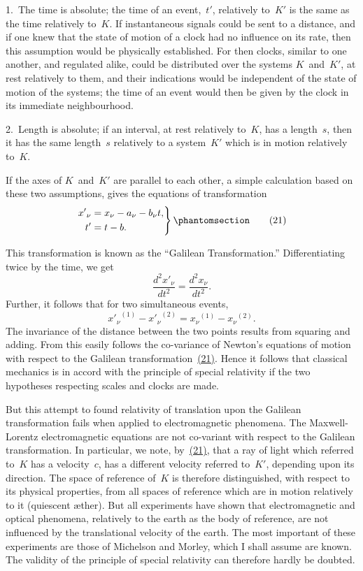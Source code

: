 \documentclass[12pt]{book}[2005/09/16]
\newcommand{\TNote}[1]{}
\newcommand{\Change}[2]{#2}
\newcommand{\Add}[1]{\Change{}{#1}}
\newcommand{\PageSep}[1]{\ignorespaces}
\newcommand{\Tag}[1]{%
  \phantomsection
  \label{eqn:#1}
  \tag*{#1}
}
\newcommand{\Eqref}[1]{\hyperref[eqn:#1]{#1}}
\begin{document}
1.~The time is absolute; the time of an event,~$t'$,
relatively to~$K'$ is the same as the time relatively to~$K$.
If instantaneous signals could be sent to a distance, and
if one knew that the state of motion of a clock had no
influence on its rate, then this assumption would be
physically established. For then clocks, similar to one
\PageSep{28}
another, and regulated alike, could be distributed over
the systems $K$~and~$K'$, at rest relatively to them, and
their indications would be independent of the state of
motion of the systems; the time of an event would then
be given by the clock in its immediate neighbourhood.

2.~Length is absolute; if an interval, at rest relatively
to~$K$, has a length~$s$, then it has the same length~$s$
relatively to a system~$K'$ which is in motion relatively
to~$K$.

If the axes of $K$~and~$K'$ are parallel to each other, a
simple calculation based on these two assumptions, gives
the equations of transformation
\[
\left.
\begin{aligned}
{x'}_{\nu} &= x_{\nu} - a_{\nu} - b_{\nu}t\Add{,} \\
t' &= t - b\Add{.}
\end{aligned}
\right\}
\Tag{(21)}
\]

This transformation is known as the ``Galilean Transformation.''
%
%
Differentiating twice by the time, we get
\[
\frac{d^{2} {x'}_{\nu}}{dt^{2}} = \frac{d^{2} x_{\nu}}{dt^{2}}.
\]
Further, it follows that for two simultaneous events,
\[
{{x'}_{\nu}}^{(1)} - {{x'}_{\nu}}^{(2)} = {x_{\nu}}^{(1)} - {x_{\nu}}^{(2)}.
\]
The invariance of the distance between the two points
results from squaring and adding. From this easily
follows the co-variance of Newton's equations of motion
with respect to the Galilean transformation~\Eqref{(21)}. Hence
it follows that classical mechanics is in accord with the
principle of special relativity if the two hypotheses
respecting scales and clocks are made.

But this attempt to found relativity of translation upon
the Galilean transformation fails when applied to electromagnetic
\PageSep{29}
phenomena. The Maxwell-Lorentz electromagnetic
equations are not co-variant with respect to the
Galilean transformation. In particular, we note, by~\Eqref{(21)},
that a ray of light which referred to~$K$ has a velocity~$c$,
has a different velocity referred to~$K'$, depending upon
its direction. The space of reference of~$K$ is therefore
distinguished, with respect to its physical properties, from
all spaces of reference which are in motion relatively to it
(quiescent æther). But all experiments have shown that
electro\Change{-}{}magnetic\TNote{** TN: Only hyphenated instance} and optical phenomena, relatively to the
earth as the body of reference, are not influenced by the
translational velocity of the earth. The most important
of these experiments are those of Michelson and Morley,
%
which I shall assume are known. The validity of the
principle of special relativity can therefore hardly be
doubted.
\end{document}
